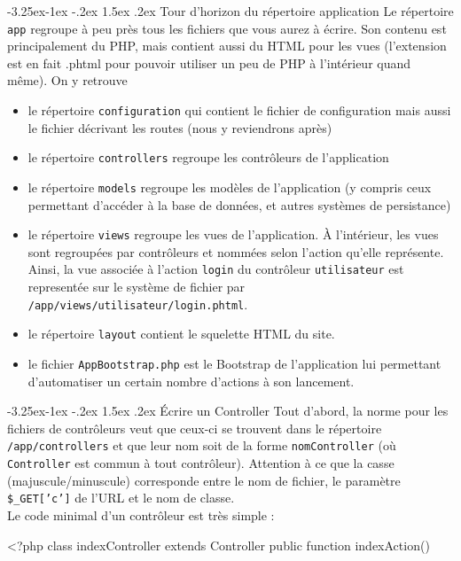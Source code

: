 \documentclass[a4paper,11pt]{article}
\makeatletter
\renewcommand{\subsection}{\@startsection{subsection}{2}{\z@}%
             {-3.25ex\@plus -1ex \@minus -.2ex}%
             {1.5ex \@plus .2ex}%
             {\color{bleuFonce}\normalfont\large\bfseries}}
\makeatother
\begin{document}
\subsection{Tour d'horizon du répertoire application}
Le répertoire \texttt{app} regroupe à peu près tous les fichiers que vous aurez à écrire. Son contenu est principalement du PHP, mais contient aussi du HTML pour les vues (l'extension est en fait .phtml pour pouvoir utiliser un peu de PHP à l'intérieur quand même). On y retrouve
\begin{itemize}
  \item le répertoire \texttt{configuration} qui contient le fichier de configuration mais aussi le fichier décrivant les routes (nous y reviendrons après)
  \item le répertoire \texttt{controllers} regroupe les contrôleurs de l'application
  \item le répertoire \texttt{models} regroupe les modèles de l'application (y compris ceux permettant d'accéder à la base de données, et autres systèmes de persistance)
  \item le répertoire \texttt{views} regroupe les vues de l'application. À l'intérieur, les vues sont regroupées par contrôleurs et nommées selon l'action qu'elle représente. Ainsi, la vue associée à l'action \texttt{login} du contrôleur \texttt{utilisateur} est representée sur le système de fichier par\\\texttt{/app/views/utilisateur/login.phtml}.
  \item le répertoire \texttt{layout} contient le squelette HTML du site.
  \item le fichier \texttt{AppBootstrap.php} est le Bootstrap de l'application lui permettant d'automatiser un certain nombre d'actions à son lancement.
\end{itemize}

\subsection{Écrire un Controller}
Tout d'abord, la norme pour les fichiers de contrôleurs veut que ceux-ci se trouvent dans le répertoire \texttt{/app/controllers} et que leur nom soit de la forme \texttt{nomController} (où \texttt{Controller} est commun à tout contrôleur). Attention à ce que la casse (majuscule/minuscule) corresponde entre le nom de fichier, le paramètre \texttt{\$\_GET['c']} de l'URL et le nom de classe.\\

Le code minimal d'un contrôleur est très simple :
\begin{PHP}
<?php   
class indexController extends Controller {
  public function indexAction() {}
}
\end{PHP}
\end{document}
